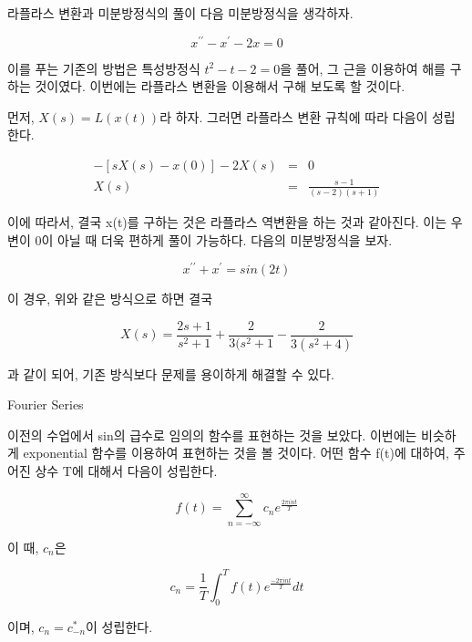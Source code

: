 \documentclass{beamer}
\begin{document}
\begin{frame}[allowframebreaks]{라플라스 변환과 미분방정식의 풀이} 
다음 미분방정식을 생각하자. 

\begin{equation} 
x^{\prime \prime} - x^{\prime} - 2x = 0
\end{equation} 

이를 푸는 기존의 방법은 특성방정식 $t^2-t-2=0$을 풀어, 그 근을 이용하여 해를 구하는 것이였다. 이번에는 라플라스 변환을 이용해서 구해 보도록 할 것이다. 

먼저, $X(s) = L(x(t))$라 하자. 그러면 라플라스 변환 규칙에 따라 다음이 성립한다. 

\begin{eqnarray} 
[s^2X(s) - sx(0) - x^{\prime}(0)] - [sX(s)-x(0)]-2X(s) &=& 0 \\ 
X(s) &=& \frac{s-1}{(s-2)(s+1)}
\end{eqnarray}

이에 따라서, 결국 x(t)를 구하는 것은 라플라스 역변환을 하는 것과 같아진다. 이는 우변이 0이 아닐 때 더욱 편하게 풀이 가능하다. 다음의 미분방정식을 보자. 

\begin{equation} 
x^{\prime \prime} + x^{\prime} = sin(2t)
\end{equation}

이 경우, 위와 같은 방식으로 하면 결국 

\begin{equation} 
X(s) = \frac{2s+1}{s^2+1} + \frac{2}{3(s^2+1} - \frac{2}{3(s^2+4)}
\end{equation} 

과 같이 되어, 기존 방식보다 문제를 용이하게 해결할 수 있다. 

\end{frame}

\begin{frame}{Fourier Series} 

이전의 수업에서 sin의 급수로 임의의 함수를 표현하는 것을 보았다. 이번에는 비슷하게 exponential 함수를 이용하여 표현하는 것을 볼 것이다. 어떤 함수 f(t)에 대하여, 주어진 상수 T에 대해서 다음이 성립한다. 

\begin{equation} 
f(t) = \sum_{n=-\infty}^{\infty} c_ne^{\frac{2 \pi i n t}{T}}
\end{equation}

이 때, $c_n$은 

\begin{equation} 
c_n = \frac{1}{T} \int^{T}_{0} f(t) e^{\frac{-2 \pi i n t}{T}} dt
\end{equation}

이며, $c_n = c_{-n}^{*}$이 성립한다. 
\end{frame}
\end{document}

